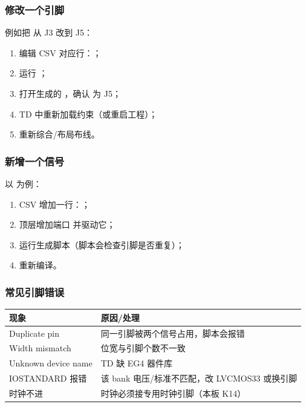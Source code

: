 \subsubsection{修改一个引脚}

例如把  从 J3 改到 J5：

\begin{enumerate}[leftmargin=2em,itemsep=2pt]
  \item 编辑 CSV 对应行：；
  \item 运行 ；
  \item 打开生成的 ，确认  为 J5；
  \item TD 中重新加载约束（或重启工程）；
  \item 重新综合/布局布线。
\end{enumerate}

\subsubsection{新增一个信号}

以  为例：

\begin{enumerate}[leftmargin=2em,itemsep=2pt]
  \item CSV 增加一行：；
  \item 顶层增加端口  并驱动它；
  \item 运行生成脚本（脚本会检查引脚是否重复）；
  \item 重新编译。
\end{enumerate}

\subsubsection{常见引脚错误}

\begin{center}
\small
\begin{tabular}{lp{8cm}}
\toprule
现象 & 原因/处理\\
\midrule
Duplicate pin & 同一引脚被两个信号占用，脚本会报错\\
Width mismatch & 位宽与引脚个数不一致\\
Unknown device name & TD 缺 EG4 器件库\\
IOSTANDARD 报错 & 该 bank 电压/标准不匹配，改 LVCMOS33 或换引脚\\
时钟不进 & 时钟必须接专用时钟引脚（本板 K14）\\
\bottomrule
\end{tabular}
\end{center}

